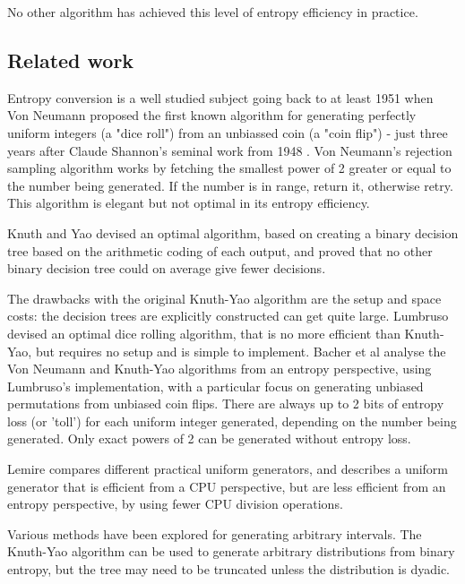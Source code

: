 \documentclass[12pt]{article}
\begin{document}
No other algorithm has achieved this level of entropy efficiency in practice.

\subsection{Related work}

Entropy conversion is a well studied subject going back to at least 1951 when Von Neumann \cite{neumann51} proposed the first known algorithm for generating perfectly uniform integers (a "dice roll") from an unbiassed coin (a "coin flip") - just three years after Claude Shannon's seminal work from 1948 \cite{shannon1948mathematical}. Von Neumann's rejection sampling algorithm works by fetching the smallest power of 2 greater or equal to the number being generated. If the number is in range, return it, otherwise retry. This algorithm is elegant but not optimal in its entropy efficiency.

Knuth and Yao \cite{Knuth1976TheCO} devised an optimal algorithm, based on creating a binary decision tree based on the arithmetic coding of each output, and proved that no other binary decision tree could on average give fewer decisions.

The drawbacks with the original Knuth-Yao algorithm are the setup and space costs: the decision trees are explicitly constructed can get quite large. Lumbruso \cite{lumbroso2013optimal} devised an optimal dice rolling algorithm, that is no more efficient than Knuth-Yao, but requires no setup and is simple to implement. Bacher et al \cite{bacher2017} analyse the Von Neumann and Knuth-Yao algorithms from an entropy perspective, using Lumbruso's implementation, with a particular focus on generating unbiased permutations from unbiased coin flips. There are always up to 2 bits of entropy loss (or 'toll') for each uniform integer generated, depending on the number being generated. Only exact powers of 2 can be generated without entropy loss.

Lemire \cite{lemire2019fast} compares different practical uniform generators, and describes a uniform generator that is efficient from a CPU perspective, but are less efficient from an entropy perspective, by using fewer CPU division operations.

Various methods have been explored for generating arbitrary intervals.
The Knuth-Yao algorithm can be used to generate arbitrary distributions from binary entropy, but the tree may need to be truncated unless the distribution is dyadic.
\end{document}
